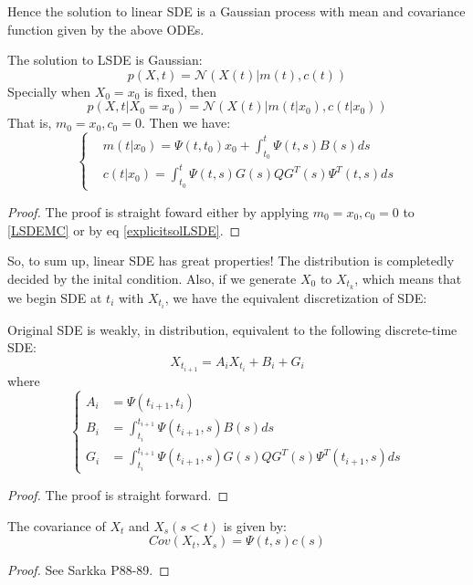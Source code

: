 Hence the solution to linear SDE is a Gaussian process with mean and covariance function given by the above ODEs.
\begin{theorem}
The solution to LSDE is Gaussian:
\begin{equation}
    p(X, t) = \mathcal{N}(X(t)|m(t), c(t))
\end{equation}
Specially when $X_0 = x_0$ is fixed, then 
\begin{equation}\label{transitiondensity}
    p(X,t|X_0=x_0) = \mathcal{N}(X(t)|m(t|x_0), c(t|x_0))
\end{equation}
That is, $m_0 = x_0, c_0 = 0$. Then we have:
\begin{equation}
    \left\{
        \begin{aligned}
            &m(t|x_0) = \Psi(t, t_0)x_0 + \int_{t_0}^t \Psi(t, s)B(s)ds\\
            &c(t|x_0) = \int_{t_0}^t \Psi(t, s)G(s)QG^T(s)\Psi^T(t, s)ds
        \end{aligned}
    \right.
\end{equation}
\end{theorem}
\begin{proof}
    The proof is straight foward either by applying $m_0 = x_0, c_0 = 0$ to \ref{LSDEMC} or by eq \ref{explicitsolLSDE}.
\end{proof}
So, to sum up, linear SDE has great properties! The distribution is completedly decided by the inital condition.
Also, if we generate $X_0$ to $X_{t_k}$, which means that we begin SDE at $t_i$ with $X_{t_i}$, we have the equivalent discretization of SDE:
\begin{theorem}
    Original SDE is weakly, in distribution, equivalent to the following discrete-time SDE:
    \begin{equation}\label{DTSDE}
        X_{t_{i+1}} = A_iX_{t_i} + B_i + G_i
    \end{equation} 
    where
    \begin{equation}\left\{
        \begin{aligned}
            A_i &= \Psi(t_{i+1}, t_i)\\
            B_i &= \int_{t_i}^{t_{i+1}} \Psi(t_{i+1}, s)B(s)ds\\
            G_i &= \int_{t_i}^{t_{i+1}} \Psi(t_{i+1}, s)G(s)QG^T(s)\Psi^T(t_{i+1}, s)ds
        \end{aligned}\right.
    \end{equation}
\end{theorem}
\begin{proof}
    The proof is straight forward.
\end{proof}
\begin{theorem}
    The covariance of $X_t$ and $X_s(s<t)$ is given by:
    \begin{equation}
        Cov(X_t, X_s) = \Psi(t, s)c(s)
    \end{equation}
\end{theorem}

\begin{proof}
    See Sarkka P88-89.
\end{proof}



